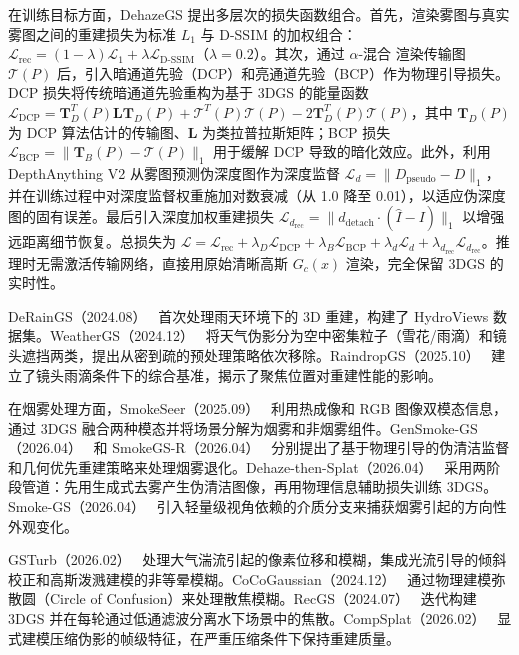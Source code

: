 在训练目标方面，DehazeGS 提出多层次的损失函数组合。首先，渲染雾图与真实雾图之间的重建损失为标准 $L_1$ 与 D-SSIM 的加权组合：$\mathcal{L}_\text{rec} = (1-\lambda)\mathcal{L}_1 + \lambda\mathcal{L}_\text{D-SSIM}$（$\lambda=0.2$）。其次，通过 $\alpha$-混合 渲染传输图 $\mathcal{T}(P)$ 后，引入暗通道先验（DCP）和亮通道先验（BCP）作为物理引导损失。DCP 损失将传统暗通道先验重构为基于 3DGS 的能量函数 $\mathcal{L}_\text{DCP} = \mathbf{T}_D^T(P)\mathbf{L}\mathbf{T}_D(P) + \mathcal{T}^T(P)\mathcal{T}(P) - 2\mathbf{T}_D^T(P)\mathcal{T}(P)$，其中 $\mathbf{T}_D(P)$ 为 DCP 算法估计的传输图、$\mathbf{L}$ 为类拉普拉斯矩阵；BCP 损失 $\mathcal{L}_\text{BCP} = \|\mathbf{T}_B(P) - \mathcal{T}(P)\|_1$ 用于缓解 DCP 导致的暗化效应。此外，利用 DepthAnything V2 从雾图预测伪深度图作为深度监督 $\mathcal{L}_d = \|D_\text{pseudo} - D\|_1$，并在训练过程中对深度监督权重施加对数衰减（从 1.0 降至 0.01），以适应伪深度图的固有误差。最后引入深度加权重建损失 $\mathcal{L}_{d_\text{rec}} = \|d_\text{detach} \cdot (\hat{I} - I)\|_1$ 以增强远距离细节恢复。总损失为 $\mathcal{L} = \mathcal{L}_\text{rec} + \lambda_D\mathcal{L}_\text{DCP} + \lambda_B\mathcal{L}_\text{BCP} + \lambda_d\mathcal{L}_d + \lambda_{d_\text{rec}}\mathcal{L}_{d_\text{rec}}$。推理时无需激活传输网络，直接用原始清晰高斯 $G_c(x)$ 渲染，完全保留 3DGS 的实时性。

DeRainGS（2024.08）~\cite{2408_11540} 首次处理雨天环境下的 3D 重建，构建了 HydroViews 数据集。WeatherGS（2024.12）~\cite{2412_18862} 将天气伪影分为空中密集粒子（雪花/雨滴）和镜头遮挡两类，提出从密到疏的预处理策略依次移除。RaindropGS（2025.10）~\cite{2510_17719} 建立了镜头雨滴条件下的综合基准，揭示了聚焦位置对重建性能的影响。

在烟雾处理方面，SmokeSeer（2025.09）~\cite{2509_17329} 利用热成像和 RGB 图像双模态信息，通过 3DGS 融合两种模态并将场景分解为烟雾和非烟雾组件。GenSmoke-GS（2026.04）~\cite{2604_03039} 和 SmokeGS-R（2026.04）~\cite{2604_05301} 分别提出了基于物理引导的伪清洁监督和几何优先重建策略来处理烟雾退化。Dehaze-then-Splat（2026.04）~\cite{2604_13589} 采用两阶段管道：先用生成式去雾产生伪清洁图像，再用物理信息辅助损失训练 3DGS。Smoke-GS（2026.04）~\cite{2604_05687} 引入轻量级视角依赖的介质分支来捕获烟雾引起的方向性外观变化。

GSTurb（2026.02）~\cite{2602_22800} 处理大气湍流引起的像素位移和模糊，集成光流引导的倾斜校正和高斯泼溅建模的非等晕模糊。CoCoGaussian（2024.12）~\cite{2412_16028} 通过物理建模弥散圆（Circle of Confusion）来处理散焦模糊。RecGS（2024.07）~\cite{2407_10318} 迭代构建 3DGS 并在每轮通过低通滤波分离水下场景中的焦散。CompSplat（2026.02）~\cite{2602_09816} 显式建模压缩伪影的帧级特征，在严重压缩条件下保持重建质量。

